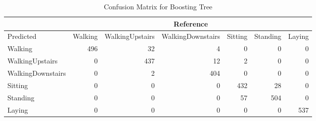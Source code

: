 \begin{table}[ht]
\centering
\caption{Confusion Matrix for Boosting Tree} 
\label{tab:conmat_boost}
\begin{tabular}{l|rrrrrr}
  &\multicolumn{6}{c}{Reference}\\
 \hline
Predicted & Walking & WalkingUpstairs & WalkingDownstairs & Sitting & Standing & Laying \\ 
  \hline
Walking & 496 &  32 &   4 &   0 &   0 &   0 \\ 
  WalkingUpstairs &   0 & 437 &  12 &   2 &   0 &   0 \\ 
  WalkingDownstairs &   0 &   2 & 404 &   0 &   0 &   0 \\ 
  Sitting &   0 &   0 &   0 & 432 &  28 &   0 \\ 
  Standing &   0 &   0 &   0 &  57 & 504 &   0 \\ 
  Laying &   0 &   0 &   0 &   0 &   0 & 537 \\ 
   \hline
\end{tabular}
\end{table}

